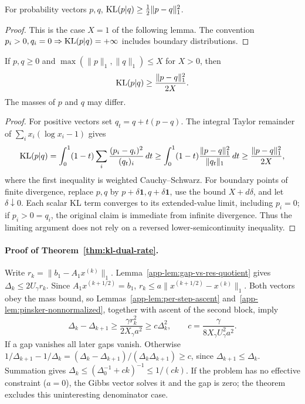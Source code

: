 \begin{proposition}\label{app-prop:pinsker-normalized}
For probability vectors $p,q$, $\mathrm{KL}(p|q)\geq\tfrac12\|p-q\|_1^2$.
\end{proposition}
\begin{proof}
This is the case $X=1$ of the following lemma. The convention $p_i>0,q_i=0\Rightarrow\mathrm{KL}(p|q)=+\infty$ includes boundary distributions.
\end{proof}

\begin{lemma}\label{app-lem:pinsker-nonnormalized}
If $p,q\geq0$ and $\max(\|p\|_1,\|q\|_1)\leq X$ for $X>0$, then
\begin{equation}\label{eq:bounded-pinsker}
\mathrm{KL}(p|q)\geq\frac{\|p-q\|_1^2}{2X}.
\end{equation}
The masses of $p$ and $q$ may differ.
\end{lemma}
\begin{proof}
For positive vectors set $q_t=q+t(p-q)$. The integral Taylor remainder of $\sum_i x_i(\log x_i-1)$ gives
\[
\mathrm{KL}(p|q)=\int_0^1(1-t)\sum_i\frac{(p_i-q_i)^2}{(q_t)_i}\,dt
\geq\int_0^1(1-t)\frac{\|p-q\|_1^2}{\|q_t\|_1}\,dt
\geq\frac{\|p-q\|_1^2}{2X},
\]
where the first inequality is weighted Cauchy--Schwarz. For boundary points of finite divergence, replace $p,q$ by $p+\delta\mathbf1,q+\delta\mathbf1$, use the bound $X+d\delta$, and let $\delta\downarrow0$. Each scalar KL term converges to its extended-value limit, including $p_i=0$; if $p_i>0=q_i$, the original claim is immediate from infinite divergence. Thus the limiting argument does not rely on a reversed lower-semicontinuity inequality.
\end{proof}

\paragraph{Proof of Theorem~\ref{thm:kl-dual-rate}.}
Write $r_k=\|b_1-A_1x^{(k)}\|_1$. Lemma~\ref{app-lem:gap-vs-res-quotient} gives $\Delta_k\leq2U_\gamma r_k$. Since $A_1x^{(k+1/2)}=b_1$,
$r_k\leq a\|x^{(k+1/2)}-x^{(k)}\|_1$. Both vectors obey the mass bound, so Lemmas~\ref{app-lem:per-step-ascent} and~\ref{app-lem:pinsker-nonnormalized}, together with ascent of the second block, imply
\[
\Delta_k-\Delta_{k+1}\geq\frac{\gamma r_k^2}{2X_\gamma a^2}
\geq c\Delta_k^2,\qquad c=\frac\gamma{8X_\gamma U_\gamma^2a^2}.
\]
If a gap vanishes all later gaps vanish. Otherwise
$1/\Delta_{k+1}-1/\Delta_k=(\Delta_k-\Delta_{k+1})/(\Delta_k\Delta_{k+1})\geq c$, since $\Delta_{k+1}\leq\Delta_k$. Summation gives $\Delta_k\leq(\Delta_0^{-1}+ck)^{-1}\leq1/(ck)$. If the problem has no effective constraint ($a=0$), the Gibbs vector solves it and the gap is zero; the theorem excludes this uninteresting denominator case.
